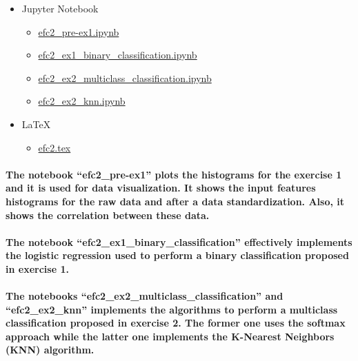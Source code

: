 \documentclass[a4paper]{article}
\begin{document}
\begin{itemize}
    \item Jupyter Notebook
    \begin{itemize}
        \item \href{https://github.com/ito-rafael/IA006C-MachineLearning/blob/master/efc2/efc2_pre-ex1.ipynb}{efc2\_pre-ex1.ipynb}
        \item \href{https://github.com/ito-rafael/IA006C-MachineLearning/blob/master/efc2/efc2_ex1_binary_classification.ipynb}{efc2\_ex1\_binary\_classification.ipynb}
        \item \href{https://github.com/ito-rafael/IA006C-MachineLearning/blob/master/efc2/efc2_ex2_multiclass_classification.ipynb}{efc2\_ex2\_multiclass\_classification.ipynb}
        \item \href{https://github.com/ito-rafael/IA006C-MachineLearning/blob/master/efc2/efc2_ex2_knn.ipynb}{efc2\_ex2\_knn.ipynb}
    \end{itemize}
    \item \LaTeX
    \begin{itemize}
        \item \href{https://github.com/ito-rafael/IA006C-MachineLearning/blob/master/efc2/LaTeX/efc2.tex}{efc2.tex}
    \end{itemize}
\end{itemize}

\paragraph{The notebook ``efc2\_pre-ex1'' plots the histograms for the exercise 1 and it is used for data visualization. It shows the input features histograms for the raw data and after a data standardization. Also, it shows the correlation between these data.}

\paragraph{The notebook ``efc2\_ex1\_binary\_classification'' effectively implements the logistic regression used to perform a binary classification proposed in exercise 1.}

\paragraph{The notebooks ``efc2\_ex2\_multiclass\_classification'' and ``efc2\_ex2\_knn'' implements the algorithms to perform a multiclass classification proposed in exercise 2. The former one uses the softmax approach while the latter one implements the K-Nearest Neighbors (KNN) algorithm.}
\end{document}
